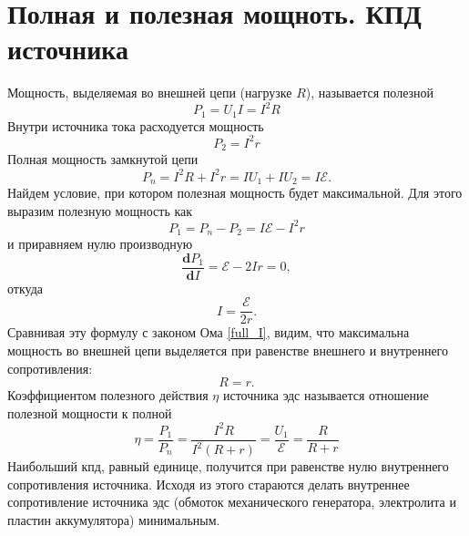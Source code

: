 \documentclass[a4paper,10pt]{book}
\begin{document}
\section{Полная и полезная мощноть. КПД источника}
Мощность, выделяемая во внешней цепи (нагрузке $R$), называется полезной
\begin{equation}
 P_1 = U_1I = I^2R\nonumber
\end{equation}
Внутри источника тока расходуется мощность 
\begin{equation}
 P_2 = I^2r\nonumber
\end{equation}
Полная мощность замкнутой цепи
\begin{equation}\label{full_P}
 P_n = I^2R + I^2r = IU_1 + IU_2 = I\mathcal{E}.
\end{equation}
Найдем условие, при котором полезная мощность будет максимальной. Для этого выразим полезную мощность как 
\begin{equation}
 P_1 = P_n - P_2 = I\mathcal{E} - I^2r\nonumber
\end{equation}
и приравняем нулю производную
\begin{equation}
 \frac{\mathbf{d}P_1}{\mathbf{d}I} = \mathcal{E} - 2Ir = 0,\nonumber
\end{equation}
откуда
\begin{equation}\label{profit_I}
 I = \frac{\mathcal{E}}{2r}.
\end{equation}
Сравнивая эту формулу с законом Ома \ref{full_I}, видим, что максимальна мощность во внешней цепи выделяется при равенстве внешнего и 
внутреннего сопротивления:
\begin{equation}\label{exeqin}
 R = r.
\end{equation}
Коэффициентом полезного действия $\eta$ источника эдс называется отношение полезной мощности к полной
\begin{equation}\label{nu}
 \eta = \frac{P_1}{P_n} = \frac{I^2R}{I^2(R + r)} = \frac{U_1}{\mathcal{E}} = \frac{R}{R + r}
\end{equation}
Наибольший кпд, равный единице, получится при равенстве нулю внутреннего сопротивления источника. Исходя из этого стараются делать внутреннее сопротивление источника эдс (обмоток механического генератора, электролита и пластин аккумулятора) минимальным.
\end{document}
